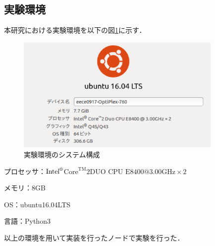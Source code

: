 \documentclass[a4paper,12pt]{jsarticle}
\begin{document}
\subsection{実験環境}
本研究における実験環境を以下の図\ref{fig:kankyou}に示す．
\begin{figure}[H]%
  \begin{center}
    \includegraphics[width=100mm]{pht/kankyou.eps}
  \end{center}
  \caption{実験環境のシステム構成}
  \label{fig:kankyou}
\end{figure}
%
\begin{description}
  \item プロセッサ：$\text{Intel}^\text{\textregistered}$$\text{Core}^\text{TM}\text{2DUO CPU E8400@3.00GHz}\times2$
  \item メモリ：$8$GB
  \item OS：ubuntu16.04LTS
  \item 言語：Python3
\end{description}
以上の環境を用いて実装を行ったノードで実験を行った．
\end{document}
